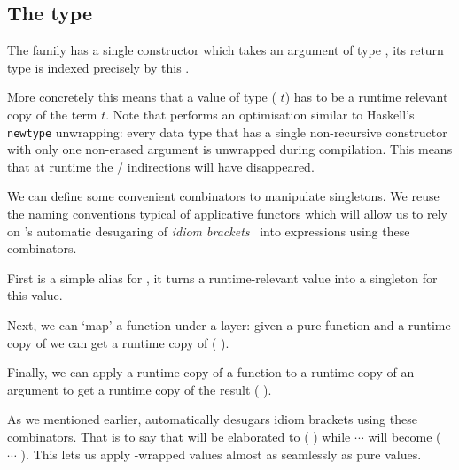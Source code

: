 
\subsection{The  type}\label{sec:datasingleton}

The  family has a single constructor
which takes an argument  of type ,
its return type is indexed precisely by this .


More concretely this means that a value of type
( $t$) has to be a runtime relevant
copy of the term $t$.
%
Note that \idris{} performs an optimisation similar to Haskell's
\texttt{newtype} unwrapping: every data type that has a single
non-recursive constructor with only one non-erased argument
is unwrapped during compilation.
%
This means that at runtime the
 /  indirections
will have disappeared.

We can define some convenient combinators to manipulate
singletons.
%
We reuse the naming conventions typical of applicative
functors which will allow us to rely on \idris{}'s automatic
desugaring of \emph{idiom brackets}~\cite{DBLP:journals/jfp/McbrideP08}
into expressions using these combinators.


First  is a simple alias for ,
it turns a runtime-relevant value  into a singleton for
this value.


Next, we can `map' a function under a  layer: given
a pure function  and a runtime copy of  we
can get a runtime copy of ( ).


Finally, we can apply a runtime copy of a function 
to a runtime copy of an argument 
to get a runtime copy of the result ( ).

As we mentioned earlier, \idris{} automatically desugars idiom brackets
using these combinators. That is to say that
\IdrisKeyword{[|}  \IdrisKeyword{|]} will be elaborated to
( ) while
\IdrisKeyword{[|}   $\cdots$  \IdrisKeyword{|]}
will become
( \IdrisFunction{<\$>}  \IdrisFunction{<*>} $\cdots$ \IdrisFunction{<*>} ).
%
This lets us apply -wrapped values almost as seamlessly as pure values.
